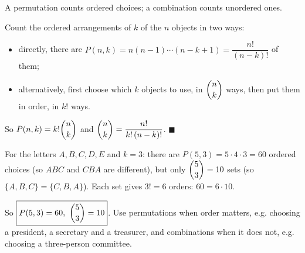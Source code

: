 A permutation counts ordered choices; a combination counts unordered ones.

Count the ordered arrangements of $k$ of the $n$ objects in two ways:
\begin{itemize}
\item directly, there are $P(n,k)=n(n-1)\cdots(n-k+1)=\dfrac{n!}{(n-k)!}$ of them;
\item alternatively, first choose which $k$ objects to use, in $\dbinom nk$ ways, then put them in order, in $k!$ ways.
\end{itemize}
So $P(n,k)=k!\dbinom nk$ and $\dbinom nk=\dfrac{n!}{k!\,(n-k)!}$. $\blacksquare$

For the letters $A,B,C,D,E$ and $k=3$: there are $P(5,3)=5\cdot4\cdot3=60$ ordered choices (so $ABC$ and $CBA$ are different), but only $\dbinom53=10$ sets (so $\{A,B,C\}=\{C,B,A\}$). Each set gives $3!=6$ orders: $60=6\cdot10$.

So $\boxed{P(5,3)=60,\ \dbinom53=10}$. Use permutations when order matters, e.g. choosing a president, a secretary and a treasurer, and combinations when it does not, e.g. choosing a three-person committee.
